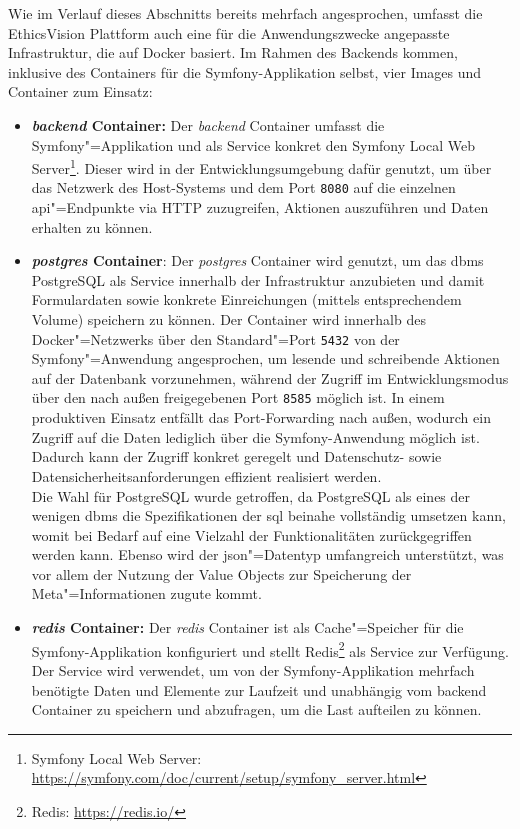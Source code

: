 \documentclass[a4paper,12pt,twoside,numbers=noendperiod]{scrreprt}
\begin{document}
Wie im Verlauf dieses Abschnitts bereits mehrfach angesprochen, umfasst die EthicsVision Plattform auch eine für die Anwendungszwecke angepasste Infrastruktur, die auf Docker basiert. Im Rahmen des Backends kommen, inklusive des Containers für die Symfony-Applikation selbst, vier Images und Container zum Einsatz:
\begin{itemize}
    \item \textbf{\textit{backend} Container:} Der \textit{backend} Container umfasst die Symfony"=Applikation und als Service konkret den Symfony Local Web Server\footnote{Symfony Local Web Server: \url{https://symfony.com/doc/current/setup/symfony_server.html}}. Dieser wird in der Entwicklungsumgebung dafür genutzt, um über das Netzwerk des Host-Systems und dem Port \texttt{8080} auf die einzelnen \ac{api}"=Endpunkte via HTTP zuzugreifen, Aktionen auszuführen und Daten erhalten zu können.
    \item \textbf{\textit{postgres} Container}: Der \textit{postgres} Container wird genutzt, um das \acl{dbms} PostgreSQL als Service innerhalb der Infrastruktur anzubieten und damit Formulardaten sowie konkrete Einreichungen (mittels entsprechendem Volume) speichern zu können. Der Container wird innerhalb des Docker"=Netzwerks über den Standard"=Port \texttt{5432} von der Symfony"=Anwendung angesprochen, um lesende und schreibende Aktionen auf der Datenbank vorzunehmen, während der Zugriff im Entwicklungsmodus über den nach außen freigegebenen Port \texttt{8585} möglich ist. In einem produktiven Einsatz entfällt das Port-Forwarding nach außen, wodurch ein Zugriff auf die Daten lediglich über die Symfony-Anwendung möglich ist. Dadurch kann der Zugriff konkret geregelt und Datenschutz- sowie Datensicherheitsanforderungen effizient realisiert werden.\\
    Die Wahl für PostgreSQL wurde getroffen, da PostgreSQL als eines der wenigen \ac{dbms} die Spezifikationen der \ac{sql} beinahe vollständig umsetzen kann, womit bei Bedarf auf eine Vielzahl der Funktionalitäten zurückgegriffen werden kann. Ebenso wird der \ac{json}"=Datentyp umfangreich unterstützt, was vor allem der Nutzung der Value Objects zur Speicherung der Meta"=Informationen zugute kommt. \cite{brumm_why_2019}
    \item \textbf{\textit{redis} Container:} Der \textit{redis} Container ist als Cache"=Speicher für die Symfony-Applikation konfiguriert und stellt Redis\footnote{Redis: \url{https://redis.io/}} als Service zur Verfügung. Der Service wird verwendet, um von der Symfony-Applikation mehrfach benötigte Daten und Elemente zur Laufzeit und unabhängig vom backend Container zu speichern und abzufragen, um die Last aufteilen zu können. 

\end{itemize}
\end{document}

